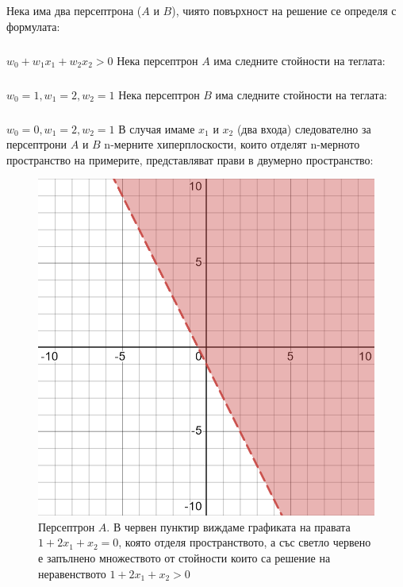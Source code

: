 \documentclass[12pt]{article}
\begin{document}
	Нека има два персептрона ($A$ и $B$), чиято повърхност на решение се
	определя с формулата:
	\subparagraph{}
	$w_{0} + w_{1}x_{1} + w_{2}x_{2} > 0$
	\newline\newline\newline
	Нека персептрон $A$ има следните стойности на теглата:
	\subparagraph{}
	$w_{0} = 1, w_{1} = 2, w_{2} = 1$
	\newline\newline
	Нека персептрон $B$ има следните стойности на теглата:
	\subparagraph{}
	$w_{0} = 0, w_{1} = 2, w_{2} = 1$
	\newline\newline\newline
	В случая имаме $x_{1}$ и $x_{2}$ (два входа) следователно за персептрони $A$ и $B$ n-мерните хиперплоскости, които отделят n-мерното пространство на примерите, представляват прави в двумерно пространство:\newpage
	\begin{figure}[H]
		\centering
		\includegraphics[width=140mm]{desmos-graph.png} 
		\caption{Персептрон $A$. В червен пунктир виждаме графиката на правата $1 + 2x_{1} + x_{2} = 0$, която отделя пространството, а със светло червено е запълнено множеството от стойности които са решение на неравенството $1 + 2x_{1} + x_{2} > 0$}
	\end{figure}
\end{document}
